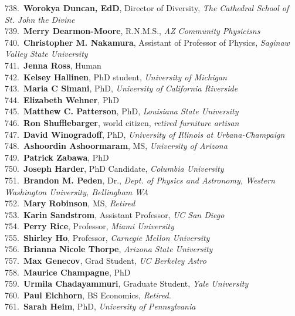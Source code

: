 738.~{\bf Worokya Duncan, EdD}, Director of Diversity, {\sl The Cathedral School of St. John the Divine} \\
739.~{\bf Merry Dearmon-Moore}, R.N.M.S., {\sl AZ Community Physicisns} \\
740.~{\bf Christopher M. Nakamura}, Assistant of Professor of Physics, {\sl Saginaw Valley State University} \\
741.~{\bf Jenna Ross}, Human \\
742.~{\bf Kelsey Hallinen}, PhD student, {\sl University of Michigan} \\
743.~{\bf Maria C Simani}, PhD, {\sl University of California Riverside} \\
744.~{\bf Elizabeth Wehner}, PhD \\
745.~{\bf Matthew C. Patterson}, PhD, {\sl Louisiana State University} \\
746.~{\bf Ron Shufflebarger}, world citizen, {\sl retired furniture artisan} \\
747.~{\bf David Winogradoff}, PhD, {\sl University of Illinois at Urbana-Champaign} \\
748.~{\bf Ashoordin Ashoormaram}, MS, {\sl University of Arizona} \\
749.~{\bf Patrick Zabawa}, PhD \\
750.~{\bf Joseph Harder}, PhD Candidate, {\sl Columbia University} \\
751.~{\bf Brandon M. Peden}, Dr., {\sl Dept. of Physics and Astronomy, Western Washington University, Bellingham WA} \\
752.~{\bf Mary Robinson}, MS, {\sl Retired} \\
753.~{\bf Karin Sandstrom}, Assistant Professor, {\sl UC San Diego} \\
754.~{\bf Perry Rice}, Professor, {\sl Miami University} \\
755.~{\bf Shirley Ho}, Professor, {\sl Carnegie Mellon University} \\
756.~{\bf Brianna Nicole Thorpe}, {\sl Arizona State University} \\
757.~{\bf Max Genecov}, Grad Student, {\sl UC Berkeley Astro} \\
758.~{\bf Maurice Champagne}, PhD \\
759.~{\bf Urmila Chadayammuri}, Graduate Student, {\sl Yale University } \\
760.~{\bf Paul Eichhorn}, BS Economics, {\sl Retired.} \\
761.~{\bf Sarah Heim}, PhD, {\sl University of Pennsylvania} \\
